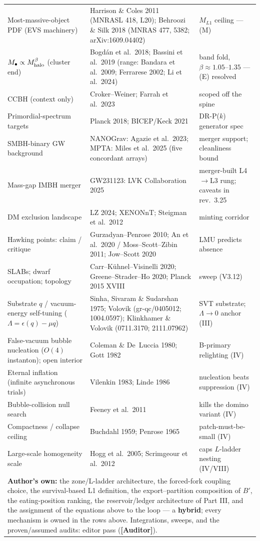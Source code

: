 \documentclass[11pt]{article}
\newcommand{\Auditor}{\textbf{\textcolor{teal!55!black}{[Auditor]}}}
\begin{document}
\begin{small}
\begin{longtable}{p{}p{}p{}}
Most-massive-object PDF (EVS machinery) & Harrison \& Coles 2011 (MNRASL 418, L20); Behroozi \& Silk 2018 (MNRAS 477, 5382; arXiv:1609.04402) & $M_{L1}$ ceiling --- (M)\\
$M_\bullet\propto M_{\rm halo}^{\beta}$ (cluster end) & Bogd\'an et al.\ 2018; Bassini et al.\ 2019 (range: Bandara et al.\ 2009; Ferrarese 2002; Li et al.\ 2024) & band fold, $\beta\approx1.05$--$1.35$ --- (E) resolved\\
CCBH (context only) & Croker--Weiner; Farrah et al.\ 2023 & scoped off the spine\\
Primordial-spectrum targets & Planck 2018; BICEP/Keck 2021 & DR-P($k$) generator spec\\
SMBH-binary GW background & NANOGrav: Agazie et al.\ 2023; MPTA: Miles et al.\ 2025 (five concordant arrays) & merger support; cleanliness bound\\
Mass-gap IMBH merger & GW231123: LVK Collaboration 2025 & merger-built L4$\to$L3 rung; caveats in rev.\ 3.25\\
DM exclusion landscape & LZ 2024; XENONnT; Steigman et al.\ 2012 & minting corridor\\
Hawking points: claim / critique & Gurzadyan--Penrose 2010; An et al.\ 2020 / Moss--Scott--Zibin 2011; Jow--Scott 2020 & LMU predicts absence\\
SLABs; dwarf occupation; topology & Carr--K\"uhnel--Visinelli 2020; Greene--Strader--Ho 2020; Planck 2015 XVIII & sweep (V3.12)\\
Substrate $q$ / vacuum-energy self-tuning ($\Lambda=\epsilon(q)-\mu q$) & Sinha, Sivaram \& Sudarshan 1975; Volovik (gr-qc/0405012; 1004.0597); Klinkhamer \& Volovik (0711.3170; 2111.07962) & SVT substrate; $\Lambda\!\to\!0$ anchor (III)\\
False-vacuum bubble nucleation ($O(4)$ instanton); open interior & Coleman \& De~Luccia 1980; Gott 1982 & B-primary relighting (IV)\\
Eternal inflation (infinite asynchronous trials) & Vilenkin 1983; Linde 1986 & nucleation beats suppression (IV)\\
Bubble-collision null search & Feeney et al.\ 2011 & kills the domino variant (IV)\\
Compactness / collapse ceiling & Buchdahl 1959; Penrose 1965 & patch-must-be-small (IV)\\
Large-scale homogeneity scale & Hogg et al.\ 2005; Scrimgeour et al.\ 2012 & caps $L$-ladder nesting (IV/VIII)\\\midrule
\multicolumn{3}{p{0.95\textwidth}}{\textbf{Author's own:} the zone/L-ladder architecture, the forced-fork coupling choice, the survival-based L1 definition, the export--partition composition of $B'$, the eating-position ranking, the reservoir/ledger architecture of Part III, and the assignment of the equations above to the loop --- a \textbf{hybrid}; every mechanism is owned in the rows above. Integrations, sweeps, and the proven/assumed audits: editor pass (\Auditor).}\\\bottomrule
\end{longtable}\end{small}
\end{document}

